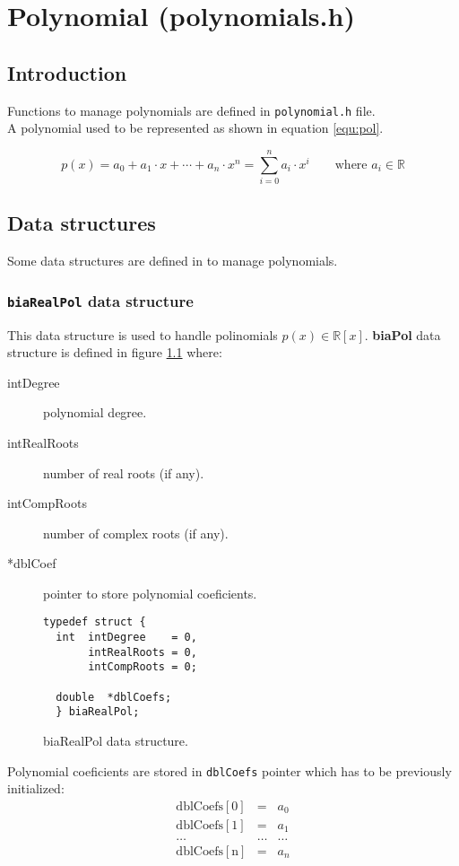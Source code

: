 %
%

\chapter{Polynomial (polynomials.h)} \label{sec:polynomial}

\section{Introduction}

Functions to manage polynomials are defined in \texttt{polynomial.h} file.\\

A polynomial used to be represented as shown in equation \ref{equ:pol}.

\begin{equation} \label{equ:pol}
p(x) = a_0 + a_1 \cdot x + \cdots + a_n \cdot x^n = \sum_{i=0}^n a_i \cdot x^i \qquad \textrm{where } a_i \in \mathbb{R}
\end{equation}

\section{Data structures}

Some data structures are defined in \BI to manage polynomials.

\subsection{\texttt{biaRealPol} data structure} \label{sec:biaRealPol}

This data structure is used to handle polinomials $p(x) \in \mathbb{R}[x]$. \textbf{biaPol} data structure is defined in figure \ref{fig:biaRealPol} where:
%
\begin{description}
\item[intDegree] polynomial degree.
\item[intRealRoots] number of real roots (if any).
\item[intCompRoots] number of complex roots (if any).
\item[*dblCoef] pointer to store polynomial coeficients.
\end{description}
%
\begin{figure}[!h]
\begin{verbatim}
typedef struct {
  int  intDegree    = 0,
       intRealRoots = 0,
       intCompRoots = 0;

  double  *dblCoefs;
  } biaRealPol;
\end{verbatim}
\caption{biaRealPol data structure.} \label{fig:biaRealPol}
\end{figure}
%
\FloatBarrier
%
Polynomial coeficients are stored in \texttt{dblCoefs} pointer which has to be previously initialized:
%
\begin{eqnarray*}
  \mathrm{dblCoefs[0]} & = & a_0 \\
  \mathrm{dblCoefs[1]} & = & a_1 \\
  \dots & \dots & \dots \\
  \mathrm{dblCoefs[n]} & = & a_n \\
\end{eqnarray*}

